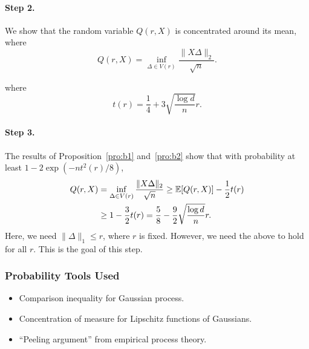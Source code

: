 \paragraph{Step 2.}
We show that the random variable $Q(r,X)$ is concentrated around its mean,
where
\begin{equation}
    Q(r,X)=\inf_{\Delta\in V(r)}\frac{\|X\Delta\|_2}{\sqrt{n}}.
\end{equation}
where
\begin{equation}
    t(r)=\frac{1}{4}+3\sqrt{\frac{\log d}{n}}r.
\end{equation}

\paragraph{Step 3.}
The results of Proposition~\ref{pro:b1} and~\ref{pro:b2} show that
with probability at least $1-2\exp(-nt^2(r)/8)$,
\begin{equation}
\begin{split}
    Q(r,X) &= \inf_{\Delta\in V(r)}\frac{\|X\Delta\|_2}{\sqrt{n}}
        \ge \mathbb{E}[Q(r,X)]-\frac{1}{2}t(r) \\
        &\ge 1-\frac{3}{2}t(r)=\frac{5}{8}-\frac{9}{2}\sqrt{\frac{\log d}{n}}r.
\end{split}
\end{equation}
Here,
we need $\|\Delta\|_1\le r$,
where $r$ is fixed.
However,
we need the above to hold for all $r$.
This is the goal of this step.

\subsubsection{Probability Tools Used}

\begin{itemize}
    \item Comparison inequality for Gaussian process.
    \item Concentration of measure for Lipschitz functions of Gaussians.
    \item ``Peeling argument'' from empirical process theory.
\end{itemize}
